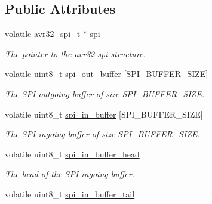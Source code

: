 \subsection*{Public Attributes}
\begin{DoxyCompactItemize}
\item 
\hypertarget{structspi__buffer__t_a4ff126b89a6ea4472480a318a74c45ca}{volatile avr32\+\_\+spi\+\_\+t $\ast$ \hyperlink{structspi__buffer__t_a4ff126b89a6ea4472480a318a74c45ca}{spi}}\label{structspi__buffer__t_a4ff126b89a6ea4472480a318a74c45ca}

\begin{DoxyCompactList}\small\item\em The pointer to the avr32 spi structure. \end{DoxyCompactList}\item 
\hypertarget{structspi__buffer__t_a07e812ffdf96a6d83ab571050637883e}{volatile uint8\+\_\+t \hyperlink{structspi__buffer__t_a07e812ffdf96a6d83ab571050637883e}{spi\+\_\+out\+\_\+buffer} \mbox{[}S\+P\+I\+\_\+\+B\+U\+F\+F\+E\+R\+\_\+\+S\+I\+Z\+E\mbox{]}}\label{structspi__buffer__t_a07e812ffdf96a6d83ab571050637883e}

\begin{DoxyCompactList}\small\item\em The S\+P\+I outgoing buffer of size S\+P\+I\+\_\+\+B\+U\+F\+F\+E\+R\+\_\+\+S\+I\+Z\+E. \end{DoxyCompactList}\item 
\hypertarget{structspi__buffer__t_ac623ff43e0f505317b752ba2f0f2077f}{volatile uint8\+\_\+t \hyperlink{structspi__buffer__t_ac623ff43e0f505317b752ba2f0f2077f}{spi\+\_\+in\+\_\+buffer} \mbox{[}S\+P\+I\+\_\+\+B\+U\+F\+F\+E\+R\+\_\+\+S\+I\+Z\+E\mbox{]}}\label{structspi__buffer__t_ac623ff43e0f505317b752ba2f0f2077f}

\begin{DoxyCompactList}\small\item\em The S\+P\+I ingoing buffer of size S\+P\+I\+\_\+\+B\+U\+F\+F\+E\+R\+\_\+\+S\+I\+Z\+E. \end{DoxyCompactList}\item 
\hypertarget{structspi__buffer__t_a0ab9fd00e386ca1746a9a4a3bfdcbf0f}{volatile uint8\+\_\+t \hyperlink{structspi__buffer__t_a0ab9fd00e386ca1746a9a4a3bfdcbf0f}{spi\+\_\+in\+\_\+buffer\+\_\+head}}\label{structspi__buffer__t_a0ab9fd00e386ca1746a9a4a3bfdcbf0f}

\begin{DoxyCompactList}\small\item\em The head of the S\+P\+I ingoing buffer. \end{DoxyCompactList}\item 
\hypertarget{structspi__buffer__t_adffdb3fca2ec974399fadcdb09cfd263}{volatile uint8\+\_\+t \hyperlink{structspi__buffer__t_adffdb3fca2ec974399fadcdb09cfd263}{spi\+\_\+in\+\_\+buffer\+\_\+tail}}\label{structspi__buffer__t_adffdb3fca2ec974399fadcdb09cfd263}


\end{DoxyCompactItemize}
